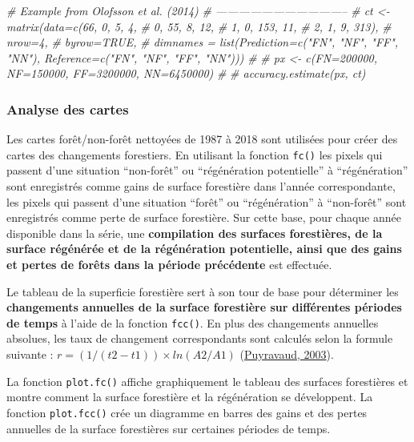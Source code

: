 \documentclass[a4paper, notitlepage, 12pt, krantz2]{krantz}
\newenvironment{Shaded}{\begin{snugshade}}{\end{snugshade}}
\newcommand{\CommentTok}[1]{\textcolor[rgb]{0.56,0.35,0.01}{\textit{#1}}}
\begin{document}
\begin{Shaded}
\begin{Highlighting}[]
\CommentTok{# Example from Olofsson et al. (2014)}
\CommentTok{# -----------------------------------}
\CommentTok{# ct <- matrix(data=c(66,  0,   5,   4,}
\CommentTok{#                     0, 55,   8,  12,}
\CommentTok{#                     1,  0, 153,  11,}
\CommentTok{#                     2,  1,   9, 313),}
\CommentTok{#              nrow=4,}
\CommentTok{#              byrow=TRUE,}
\CommentTok{#              dimnames = list(Prediction=c("FN", "NF", "FF", "NN"), Reference=c("FN", "NF", "FF", "NN")))}
\CommentTok{# }
\CommentTok{# px <- c(FN=200000, NF=150000, FF=3200000, NN=6450000)}
\CommentTok{# }
\CommentTok{# accuracy.estimate(px, ct)}
\end{Highlighting}
\end{Shaded}

\hypertarget{analyse-des-cartes}{%
\subsubsection{Analyse des cartes}\label{analyse-des-cartes}}

Les cartes forêt/non-forêt nettoyées de 1987 à 2018 sont utilisées pour créer des cartes des changements forestiers. En utilisant la fonction \texttt{fc()} les pixels qui passent d'une situation ``non-forêt'' ou ``régénération potentielle'' à ``régénération'' sont enregistrés comme gains de surface forestière dans l'année correspondante, les pixels qui passent d'une situation ``forêt'' ou ``régénération'' à ``non-forêt'' sont enregistrés comme perte de surface forestière. Sur cette base, pour chaque année disponible dans la série, une \textbf{compilation des surfaces forestières, de la surface régénérée et de la régénération potentielle, ainsi que des gains et pertes de forêts dans la période précédente} est effectuée.

Le tableau de la superficie forestière sert à son tour de base pour déterminer les \textbf{changements annuelles de la surface forestière sur différentes périodes de temps} à l'aide de la fonction \texttt{fcc()}. En plus des changements annuelles absolues, les taux de changement correspondants sont calculés selon la formule suivante : \(r = (1/(t2 - t1)) \times ln(A2/A1)\) (\href{https://www.sciencedirect.com/science/article/abs/pii/S0378112702003353}{Puyravaud, 2003}).

La fonction \texttt{plot.fc()} affiche graphiquement le tableau des surfaces forestières et montre comment la surface forestière et la régénération se développent. La fonction \texttt{plot.fcc()} crée un diagramme en barres des gains et des pertes annuelles de la surface forestières sur certaines périodes de temps.
\end{document}
